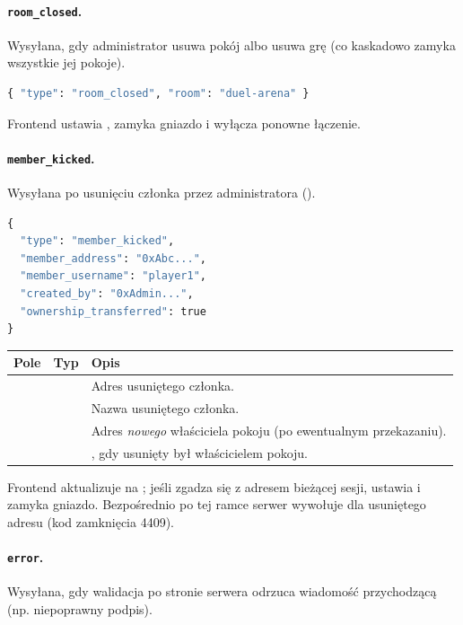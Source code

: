 \paragraph{\texttt{room\_closed}.} Wysyłana, gdy administrator usuwa pokój albo usuwa grę (co kaskadowo
zamyka wszystkie jej pokoje).

\begin{lstlisting}[language=Python]
{ "type": "room_closed", "room": "duel-arena" }
\end{lstlisting}

Frontend ustawia , zamyka gniazdo i wyłącza ponowne łączenie.

\paragraph{\texttt{member\_kicked}.} Wysyłana po usunięciu członka przez administratora
().

\begin{lstlisting}[language=Python]
{
  "type": "member_kicked",
  "member_address": "0xAbc...",
  "member_username": "player1",
  "created_by": "0xAdmin...",
  "ownership_transferred": true
}
\end{lstlisting}

\begin{tabularx}{\textwidth}{llY}
\toprule
Pole & Typ & Opis \\
\midrule
{} &  & Adres usuniętego członka. \\
 &  & Nazwa usuniętego członka. \\
 &  & Adres \emph{nowego} właściciela pokoju (po ewentualnym przekazaniu). \\
 &  & , gdy usunięty był właścicielem pokoju. \\
\bottomrule
\end{tabularx}

Frontend aktualizuje  na ; jeśli  zgadza się z adresem
bieżącej sesji, ustawia  i zamyka gniazdo. Bezpośrednio po tej ramce serwer wywołuje
 dla usuniętego adresu (kod zamknięcia 4409).

\paragraph{\texttt{error}.} Wysyłana, gdy walidacja po stronie serwera odrzuca wiadomość przychodzącą
(np. niepoprawny podpis).

